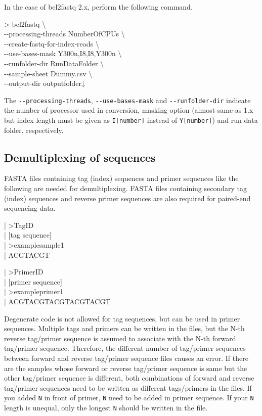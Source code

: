 \documentclass[titlepage,10pt,a4paper,english]{jsbook}
\newenvironment{content}{\begin{shaded}\vspace{-1em}\raggedright\ttfamily\footnotesize\setlength{\baselineskip}{1.4em}}{\end{shaded}\vspace{-1em}}
\newenvironment{cmd}{\begin{oframed}\raggedright\ttfamily\footnotesize\setlength{\baselineskip}{1.4em}}{\end{oframed}\vspace{-1em}}
\begin{document}
In the case of bcl2fastq 2.x, perform the following command.

\begin{cmd}
{\textgreater} bcl2fastq {\textbackslash}\\
{-}{-}processing-threads NumberOfCPUs {\textbackslash}\\
{-}{-}create-fastq-for-index-reads {\textbackslash}\\
{-}{-}use-bases-mask Y300n,I8,I8,Y300n {\textbackslash}\\
{-}{-}runfolder-dir RunDataFolder {\textbackslash}\\
{-}{-}sample-sheet Dummy.csv {\textbackslash}\\
{-}{-}output-dir outputfolder↓
\end{cmd}

The \texttt{{-}{-}processing-threads}, \texttt{{-}{-}use-bases-mask} and \texttt{{-}{-}runfolder-dir} indicate the number of processor used in conversion, masking option (almost same as 1.x but index length must be given as \texttt{I[number]} instead of \texttt{Y[number]}) and run data folder, respectively.

\subsection{Demultiplexing of sequences}

FASTA files containing tag (index) sequences and primer sequences like the following are needed for demultiplexing.
FASTA files containing secondary tag (index) sequences and reverse primer sequences are also required for paired-end sequencing data.

\begin{content}
| {\textgreater}TagID\\
| [tag sequence]\\
| {\textgreater}examplesample1\\
| ACGTACGT
\end{content}

\begin{content}
| {\textgreater}PrimerID\\
| [primer sequence]\\
| {\textgreater}exampleprimer1\\
| ACGTACGTACGTACGTACGT
\end{content}

Degenerate code is not allowed for tag sequences, but can be used in primer sequences.
Multiple tags and primers can be written in the files, but the N-th reverse tag/primer sequence is assumed to associate with the N-th forward tag/primer sequence.
Therefore, the different number of tag/primer sequences between forward and reverse tag/primer sequence files causes an error.
If there are the samples whose forward or reverse tag/primer sequence is same but the other tag/primer sequence is different, both combinations of forward and reverse tag/primer sequences need to be written as different tags/primers in the files.
If you added \texttt{N} in front of primer, \texttt{N} need to be added in primer sequence.
If your \texttt{N} length is unequal, only the longest \texttt{N} should be written in the file.
\end{document}
